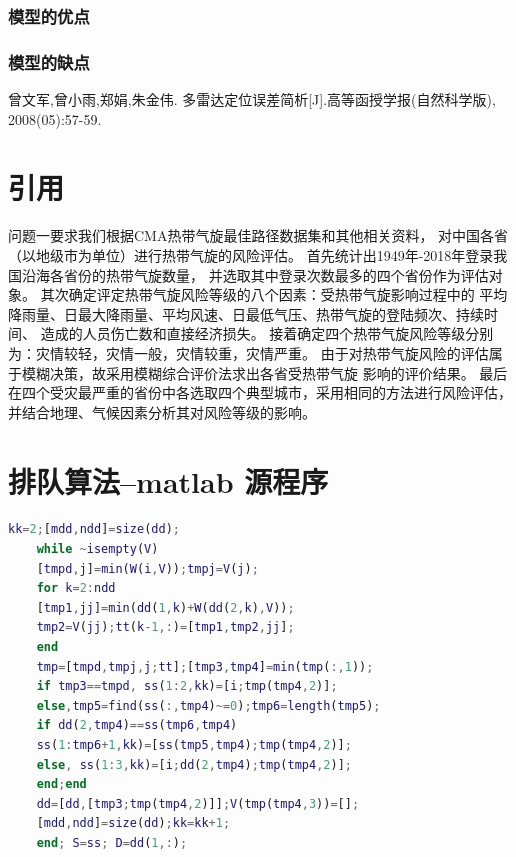 \documentclass{cumcmthesis}
\begin{document}
\subsubsection{模型的优点}

\subsubsection{模型的缺点}
   

\begin{thebibliography}{9}%
曾文军,曾小雨,郑娟,朱金伟.
    多雷达定位误差简析[J].高等函授学报(自然科学版),
    2008(05):57-59.

\end{thebibliography}


\newpage
\begin{appendices}
\section{引用}
  问题一要求我们根据CMA热带气旋最佳路径数据集和其他相关资料，
对中国各省（以地级市为单位）进行热带气旋的风险评估。
首先统计出1949年-2018年登录我国沿海各省份的热带气旋数量，
并选取其中登录次数最多的四个省份作为评估对象。
其次确定评定热带气旋风险等级的八个因素：受热带气旋影响过程中的
平均降雨量、日最大降雨量、平均风速、日最低气压、热带气旋的登陆频次、持续时间、
造成的人员伤亡数和直接经济损失。
接着确定四个热带气旋风险等级分别为：灾情较轻，灾情一般，灾情较重，灾情严重。
由于对热带气旋风险的评估属于模糊决策，故采用模糊综合评价法求出各省受热带气旋
影响的评价结果。\cite{bib:one}
最后在四个受灾最严重的省份中各选取四个典型城市，采用相同的方法进行风险评估，
并结合地理、气候因素分析其对风险等级的影响。

\section{排队算法--matlab 源程序}
    \begin{lstlisting}[language=matlab]
    kk=2;[mdd,ndd]=size(dd);
    while ~isempty(V)
    [tmpd,j]=min(W(i,V));tmpj=V(j);
    for k=2:ndd
    [tmp1,jj]=min(dd(1,k)+W(dd(2,k),V));
    tmp2=V(jj);tt(k-1,:)=[tmp1,tmp2,jj];
    end
    tmp=[tmpd,tmpj,j;tt];[tmp3,tmp4]=min(tmp(:,1));
    if tmp3==tmpd, ss(1:2,kk)=[i;tmp(tmp4,2)];
    else,tmp5=find(ss(:,tmp4)~=0);tmp6=length(tmp5);
    if dd(2,tmp4)==ss(tmp6,tmp4)
    ss(1:tmp6+1,kk)=[ss(tmp5,tmp4);tmp(tmp4,2)];
    else, ss(1:3,kk)=[i;dd(2,tmp4);tmp(tmp4,2)];
    end;end
    dd=[dd,[tmp3;tmp(tmp4,2)]];V(tmp(tmp4,3))=[];
    [mdd,ndd]=size(dd);kk=kk+1;
    end; S=ss; D=dd(1,:);
    \end{lstlisting}


\end{appendices}
\end{document}
